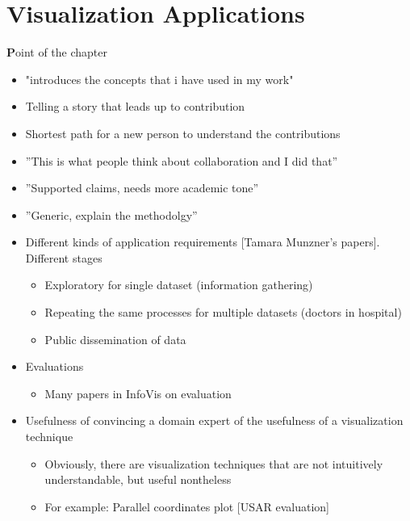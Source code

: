 \chapter{Visualization Applications}
\label{cha:visapp}

{\textbf Point of the chapter} 
\begin{itemize}
\item "introduces the concepts that i have used in my work"
\item Telling a story that leads up to contribution 
\item Shortest path for a new person to understand the contributions
\item ''This is what people think about collaboration and I did that''
\item ''Supported claims, needs more academic tone''
\item ''Generic, explain the methodolgy''
\end{itemize}

\begin{itemize}
  \item Different kinds of application requirements [Tamara Munzner's papers]. Different stages
  \begin{itemize}
    \item Exploratory for single dataset (information gathering)
    \item Repeating the same processes for multiple datasets (doctors in hospital)
    \item Public dissemination of data
  \end{itemize}
  \item Evaluations
  \begin{itemize}
    \item Many papers in InfoVis on evaluation
  \end{itemize}
  \item Usefulness of convincing a domain expert of the usefulness of a visualization technique
  \begin{itemize}
    \item Obviously, there are visualization techniques that are not intuitively understandable, but useful nontheless
    \item For example: Parallel coordinates plot [USAR evaluation]
  \end{itemize}
\end{itemize}

